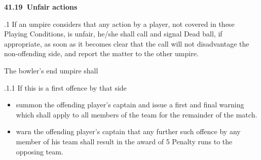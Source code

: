 \documentclass[12pt]{article}
\begin{document}
\vspace{\baselineskip}
\begin{Center}
{\fontsize{8pt}{9.6pt}\par}
\end{Center}\par


\vspace{\baselineskip}
{\fontsize{11pt}{13.2pt}\selectfont \textbf{41.19\  Unfair actions}\par}\par


\vspace{\baselineskip}
\begin{adjustwidth}{0.5in}{0.06in}
\begin{justify}
{\fontsize{9pt}{10.8pt}.1 If an umpire considers that any action by a player, not covered in these Playing Conditions, is unfair, he/she shall call and signal Dead ball, if appropriate, as soon as it becomes clear that the call will not disadvantage the non-offending side, and report the matter to the other umpire.\par}
\end{justify}\par

\end{adjustwidth}


\vspace{\baselineskip}
\begin{adjustwidth}{0.5in}{0.0in}
{\fontsize{9pt}{10.8pt}\selectfont The bowler’s end umpire shall\par}\par

\end{adjustwidth}


\vspace{\baselineskip}
\begin{adjustwidth}{0.49in}{0.0in}
{\fontsize{9pt}{10.8pt}.1.1 \tabto{1.17in} If this is a first offence by that side\par}\par

\end{adjustwidth}


\vspace{\baselineskip}
\begin{itemize}
	\item {\fontsize{9pt}{10.8pt}\selectfont summon the offending player’s captain and issue a first and final warning which shall apply to all members of the team for the remainder of the match.\par}\par


\vspace{\baselineskip}
	\item {\fontsize{9pt}{10.8pt}\selectfont warn the offending player’s captain that any further such offence by any member of his team shall result in the award of 5 Penalty runs to the opposing team.\par}
\end{itemize}\par
\end{document}
